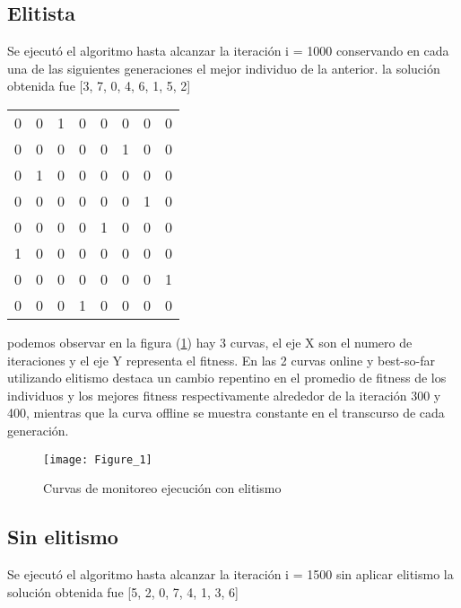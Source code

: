 \documentclass[11pt]{article}
\begin{document}
\subsection{Elitista}
Se ejecut\'o el algoritmo hasta alcanzar la iteraci\'on i = 1000  conservando en cada una de las siguientes
generaciones el mejor individuo de la anterior.
la soluci\'on obtenida fue [3, 7, 0, 4, 6, 1, 5, 2]
\begin{center}
\begin{tabular}{ c c c c c c c c }
	0 & 0 & 1 & 0 & 0 & 0 & 0 & 0\\
	0 & 0 & 0 & 0 & 0 & 1 & 0 & 0\\
	0 & 1 & 0 & 0 & 0 & 0 & 0 & 0\\
	0 & 0 & 0 & 0 & 0 & 0 & 1 & 0\\
	0 & 0 & 0 & 0 & 1 & 0 & 0 & 0\\
	1 & 0 & 0 & 0 & 0 & 0 & 0 & 0\\
	0 & 0 & 0 & 0 & 0 & 0 & 0 & 1\\
	0 & 0 & 0 & 1 & 0 & 0 & 0 & 0
\end{tabular}
\end{center}
podemos observar en la figura (\ref{elitismo}) hay 3 curvas, el eje X son el numero de iteraciones y el eje Y representa el fitness. En las 2 curvas online y best-so-far utilizando elitismo destaca un cambio repentino en el promedio de fitness de los individuos y los mejores fitness respectivamente alrededor de la iteraci\'on 300 y 400, mientras que la curva offline se muestra constante en el transcurso de cada generaci\'on.
\begin{figure}[t]
    \texttt{[image: Figure\_1]}
    \centering
    \caption{Curvas de monitoreo ejecuci\'on con elitismo}
    \label{elitismo}
    \end{figure}
\subsection{Sin elitismo}
Se ejecut\'o el algoritmo hasta alcanzar la iteraci\'on i = 1500 sin aplicar elitismo la soluci\'on obtenida fue [5, 2, 0, 7, 4, 1, 3, 6]
\end{document}
